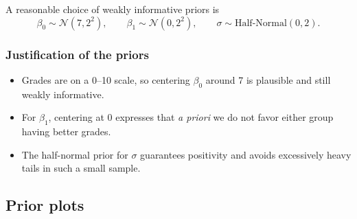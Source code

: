 \documentclass[
  12pt,
]{article}
\providecommand{\tightlist}{%
  \setlength{\itemsep}{0pt}\setlength{\parskip}{0pt}}
\begin{document}
A reasonable choice of weakly informative priors is \[
\beta_0 \sim \mathcal N(7, 2^2), \qquad
\beta_1 \sim \mathcal N(0, 2^2), \qquad
\sigma \sim \text{Half-Normal}(0, 2).
\]

\subsubsection{Justification of the
priors}\label{justification-of-the-priors}

\begin{itemize}
\tightlist
\item
  Grades are on a 0--10 scale, so centering \(\beta_0\) around 7 is
  plausible and still weakly informative.
\item
  For \(\beta_1\), centering at 0 expresses that \emph{a priori} we do
  not favor either group having better grades.
\item
  The half-normal prior for \(\sigma\) guarantees positivity and avoids
  excessively heavy tails in such a small sample.
\end{itemize}

\subsection{Prior plots}\label{prior-plots}
\end{document}
